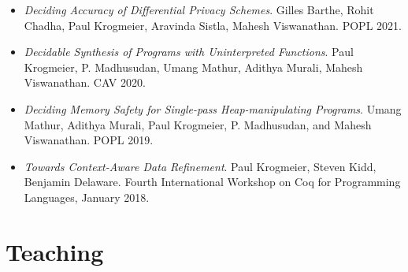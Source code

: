 \documentclass[12pt,a4paper,sans]{moderncv}        %
\newcommand{\MYhref}[3][assassinblue]{\href{#2}{\color{#1}{#3}}}%
\begin{document}
\vspace{4pt}
\begin{itemize}
\item \emph{Deciding Accuracy of Differential Privacy
    Schemes}. Gilles Barthe, Rohit Chadha, Paul Krogmeier, Aravinda
  Sistla, Mahesh Viswanathan. POPL 2021. \MYhref{https://dl.acm.org/doi/abs/10.1145/3434289}{Paper.}
  \vspace{10pt}
\item \emph{Decidable Synthesis of Programs with Uninterpreted
    Functions}.  Paul Krogmeier, P. Madhusudan, Umang Mathur, Adithya
  Murali, Mahesh Viswanathan. CAV
  2020. \MYhref{https://link.springer.com/chapter/10.1007/978-3-030-53291-8_32}{Paper.}
  \vspace{10pt}
\item \emph{Deciding Memory Safety for Single-pass Heap-manipulating
    Programs}. Umang Mathur, Adithya Murali, Paul Krogmeier,
  P. Madhusudan, and Mahesh Viswanathan. POPL 2019.
  \MYhref{https://doi.org/10.1145/3371103}{Paper.} \vspace{10pt}
\item \emph{Towards Context-Aware Data Refinement}. Paul Krogmeier,
  Steven Kidd, Benjamin Delaware. Fourth International Workshop on Coq
  for Programming Languages, January
  2018. \MYhref{https://popl18.sigplan.org/details/CoqPL-2018/4/Towards-Context-Aware-Data-Refinement}{Paper.}
\end{itemize}

\section{Teaching}
\label{sec:teaching}
\end{document}
